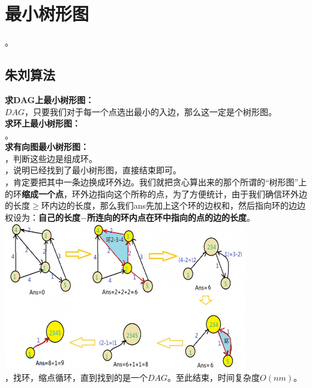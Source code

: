 \documentclass[a4paper]{book}
\begin{document}
\section{最小树形图}
。
\subsection{朱刘算法}
\noindent\textbf{求DAG上最小树形图：}\\
$DAG$，只要我们对于每一个点选出最小的入边，那么这一定是个树形图。\\
\noindent\textbf{求环上最小树形图：}\\
。\\
\noindent\textbf{求有向图最小树形图：}\\
，判断这些边是组成环。\\
，说明已经找到了最小树形图，直接结束即可。\\
，肯定要把其中一条边换成环外边。我们就把贪心算出来的那个所谓的“树形图”上的环\textbf{缩成一个点}，环外边指向这个所称的点，为了方便统计，由于我们确信环外边的长度$\ge$环内边的长度，那么我们ans先加上这个环的边权和，然后指向环的边边权设为：\textbf{自己的长度$-$所连向的环内点在环中指向的点的边的长度}。\\
\includegraphics[width=0.8\textwidth,center]{../photo/zl.jpg}\\
，找环，缩点循环，直到找到的是一个$DAG$。至此结束，时间复杂度$O(nm)$。
\end{document}
